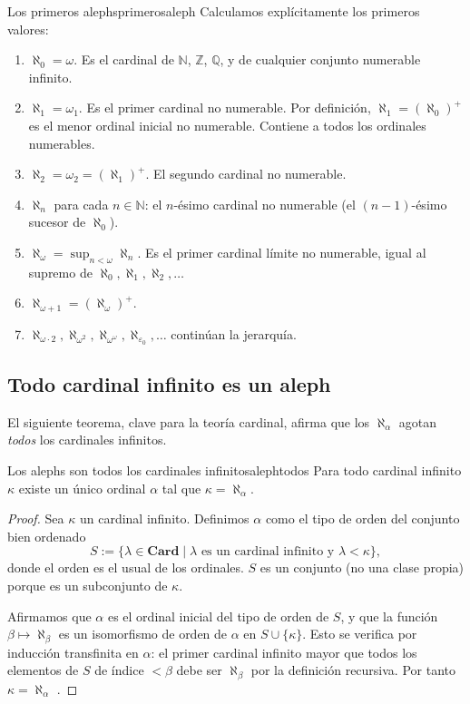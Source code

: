 \begin{ejemplo}{Los primeros alephs}{primerosaleph}
Calculamos explícitamente los primeros valores:
\begin{enumerate}[leftmargin=2em, label=(\alph*)]
  \item $\aleph_0 = \omega$. Es el cardinal de $\mathbb{N}$, $\mathbb{Z}$, $\mathbb{Q}$, y de cualquier conjunto numerable infinito.
  \item $\aleph_1 = \omega_1$. Es el primer cardinal no numerable. Por definición, $\aleph_1 = (\aleph_0)^+$ es el menor ordinal inicial no numerable. Contiene a todos los ordinales numerables.
  \item $\aleph_2 = \omega_2 = (\aleph_1)^+$. El segundo cardinal no numerable.
  \item $\aleph_n$ para cada $n \in \mathbb{N}$: el $n$-ésimo cardinal no numerable (el $(n-1)$-ésimo sucesor de $\aleph_0$).
  \item $\aleph_\omega = \sup_{n < \omega} \aleph_n$. Es el primer cardinal límite no numerable, igual al supremo de $\aleph_0, \aleph_1, \aleph_2, \ldots$
  \item $\aleph_{\omega+1} = (\aleph_\omega)^+$.
  \item $\aleph_{\omega \cdot 2}, \aleph_{\omega^2}, \aleph_{\omega^\omega}, \aleph_{\varepsilon_0}, \ldots$ continúan la jerarquía.
\end{enumerate}
\end{ejemplo}

\subsection{Todo cardinal infinito es un aleph}

El siguiente teorema, clave para la teoría cardinal, afirma que los $\aleph_\alpha$ agotan \emph{todos} los cardinales infinitos.

\begin{teorema}{Los alephs son todos los cardinales infinitos}{alephtodos}
Para todo cardinal infinito $\kappa$ existe un único ordinal $\alpha$ tal que $\kappa = \aleph_\alpha$.
\end{teorema}

\begin{proof}
Sea $\kappa$ un cardinal infinito. Definimos $\alpha$ como el tipo de orden del conjunto bien ordenado
\[
  S := \{\lambda \in \mathbf{Card} \mid \lambda \text{ es un cardinal infinito y } \lambda < \kappa\},
\]
donde el orden es el usual de los ordinales. $S$ es un conjunto (no una clase propia) porque es un subconjunto de $\kappa$.

Afirmamos que $\alpha$ es el ordinal inicial del tipo de orden de $S$, y que la función $\beta \mapsto \aleph_\beta$ es un isomorfismo de orden de $\alpha$ en $S \cup \{\kappa\}$. Esto se verifica por inducción transfinita en $\alpha$: el primer cardinal infinito mayor que todos los elementos de $S$ de índice $< \beta$ debe ser $\aleph_\beta$ por la definición recursiva. Por tanto $\kappa = \aleph_\alpha$ \cite{jech2003, kunen2011}.
\end{proof}

